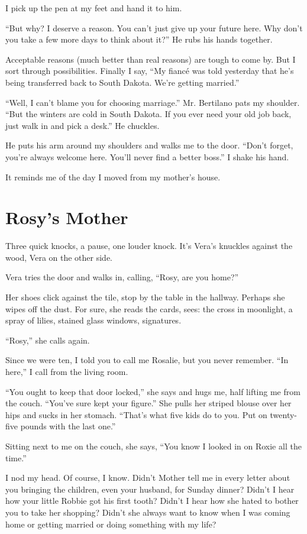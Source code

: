 \documentclass[twoside,10pt]{book}
\begin{document}
I pick up the pen at my feet and hand it to him.

``But why? I deserve a reason. You can't just give up your future here.
Why don't you take a few more days to think about it?'' He rubs his
hands together.

Acceptable reasons (much better than real reasons) are tough to come by.
But I sort through possibilities. Finally I say, ``My fiancé was told
yesterday that he's being transferred back to South Dakota. We're
getting married.''

``Well, I can't blame you for choosing marriage.'' Mr. Bertilano pats my
shoulder. ``But the winters are cold in South Dakota. If you ever need
your old job back, just walk in and pick a desk.'' He chuckles.

He puts his arm around my shoulders and walks me to the door. ``Don't
forget, you're always welcome here. You'll never find a better boss.'' I
shake his hand.

It reminds me of the day I moved from my mother's house.



\cleardoublepage
\chapter{Rosy's Mother}

Three quick knocks, a pause, one louder knock. It's Vera's knuckles
against the wood, Vera on the other side.

Vera tries the door and walks in, calling, ``Rosy, are you home?''

Her shoes click against the tile, stop by the table in the hallway.
Perhaps she wipes off the dust. For sure, she reads the cards, sees: the
cross in moonlight, a spray of lilies, stained glass windows,
signatures.

``Rosy,'' she calls again.

Since we were ten, I told you to call me Rosalie, but you never
remember. ``In here,'' I call from the living room.

``You ought to keep that door locked,'' she says and hugs me, half
lifting me from the couch. ``You've sure kept your figure.'' She pulls
her striped blouse over her hips and sucks in her stomach. ``That's what
five kids do to you. Put on twenty-five pounds with the last one.''

Sitting next to me on the couch, she says, ``You know I looked in on
Roxie all the time.''

I nod my head. Of course, I know. Didn't Mother tell me in every letter
about you bringing the children, even your husband, for Sunday dinner?
Didn't I hear how your little Robbie got his first tooth? Didn't I hear
how she hated to bother you to take her shopping? Didn't she always want
to know when I was coming home or getting married or doing something
with my life?
\end{document}
